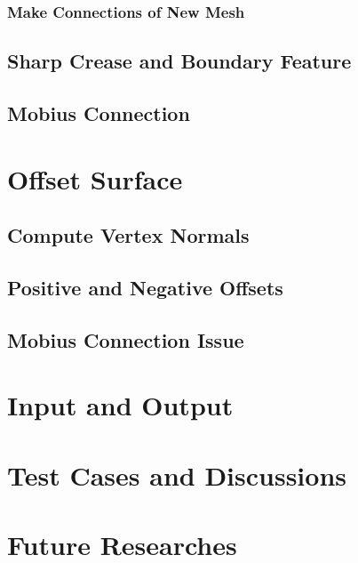 \documentclass[12pt]{article}
\begin{document}
\subsubsection{Make Connections of New Mesh}

\subsection{Sharp Crease and Boundary Feature}

\subsection{Mobius Connection}

\section{Offset Surface} \label{sec:offset}

\subsection{Compute Vertex Normals}

\subsection{Positive and Negative Offsets}

\subsection{Mobius Connection Issue}

\section{Input and Output}

\section{Test Cases and Discussions}

\section{Future Researches}
\end{document}
